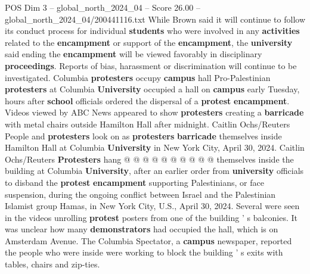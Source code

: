 \begin{textsample}{POS Dim 3 – global\_north\_2024\_04 – Score 26.00 – global\_north\_2024\_04/200441116.txt}
While Brown said it will continue to follow its conduct process for individual \textbf{students} who were involved in any \textbf{activities} related to the \textbf{encampment} or support of the \textbf{encampment}, the \textbf{university} said ending the \textbf{encampment} will be viewed favorably in disciplinary \textbf{proceedings}.
Reports of bias, harassment or discrimination will continue to be investigated.
Columbia \textbf{protesters} occupy \textbf{campus} hall Pro-Palestinian \textbf{protesters} at Columbia \textbf{University} occupied a hall on \textbf{campus} early Tuesday, hours after \textbf{school} officials ordered the dispersal of a \textbf{protest} \textbf{encampment}.
Videos viewed by ABC News appeared to show \textbf{protesters} creating a \textbf{barricade} with metal chairs outside Hamilton Hall after midnight.
Caitlin Ochs/Reuters People and \textbf{protesters} look on as \textbf{protesters} \textbf{barricade} themselves inside Hamilton Hall at Columbia \textbf{University} in New York City, April 30, 2024.
Caitlin Ochs/Reuters \textbf{Protesters} hang @ @ @ @ @ @ @ @ @ @ themselves inside the building at Columbia \textbf{University}, after an earlier order from \textbf{university} officials to disband the \textbf{protest} \textbf{encampment} supporting Palestinians, or face suspension, during the ongoing conflict between Israel and the Palestinian Islamist group Hamas, in New York City, U.S., April 30, 2024.
Several were seen in the videos unrolling \textbf{protest} posters from one of the building ' s balconies.
It was unclear how many \textbf{demonstrators} had occupied the hall, which is on Amsterdam Avenue.
The Columbia Spectator, a \textbf{campus} newspaper, reported the people who were inside were working to block the building ' s exits with tables, chairs and zip-ties.

\end{textsample}
